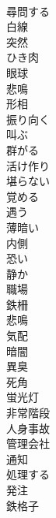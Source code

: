 \documentclass[8pt]{extreport}
\begin{document}
\begin{CJK}{UTF8}{min}
\\	尋問する
\\	白線
\\	突然
\\	ひき肉
\\	眼球
\\	悲鳴
\\	形相
\\	振り向く
\\	叫ぶ
\\	群がる
\\	活け作り
\\	堪らない
\\	覚める
\\	遇う
\\	薄暗い
\\	内側
\\	恐い
\\	静か
\\	職場
\\	鉄柵
\\	悲鳴
\\	気配
\\	暗闇
\\	異臭
\\	死角
\\	蛍光灯
\\	非常階段
\\	人身事故
\\	管理会社
\\	通知
\\	処理する
\\	発注
\\	鉄格子
\end{CJK}
\end{document}
